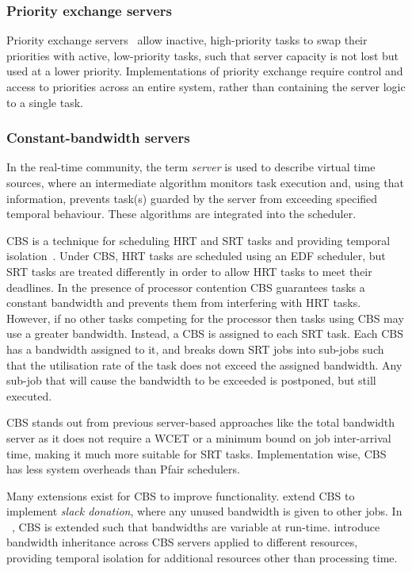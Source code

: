 \subsubsection{Priority exchange servers}

Priority exchange servers~\citep{Sprunt_SL_89a, Spuri_Buttazzo_94} allow inactive, high-priority tasks to swap their
priorities with active, low-priority tasks, such that server capacity is not lost but used at a lower
priority. Implementations of priority exchange require control and access to priorities across an
entire system, rather than containing the server logic to a single task.

\subsubsection{Constant-bandwidth servers}

In the real-time community, the term \emph{server} is used to describe virtual time sources, where
an intermediate algorithm monitors task execution and, using that information, prevents task(s)
guarded by the server from exceeding specified temporal behaviour. These algorithms are integrated
into the scheduler.

\Gls{CBS} is a technique for scheduling \gls{HRT} and
\gls{SRT} tasks and providing temporal isolation~\citep{Abeni_Buttazzo_04}. Under \gls{CBS}, \gls{HRT} tasks are scheduled using an \gls{EDF}
scheduler, but \gls{SRT} tasks are treated differently in order to allow \gls{HRT} tasks to meet
their deadlines. In the presence of processor contention \gls{CBS} guarantees tasks a constant
bandwidth and prevents them from interfering with \gls{HRT} tasks. However, if no other tasks
competing for the processor then tasks using CBS may use a greater bandwidth.
Instead, a \gls{CBS} is assigned to each \gls{SRT} task.  Each \gls{CBS} has a bandwidth assigned to
it, and breaks down \gls{SRT} jobs into sub-jobs such that the utilisation rate of the task does not
exceed the assigned bandwidth.  Any sub-job that will cause the bandwidth to be exceeded is
postponed, but still executed.

\gls{CBS} stands out from previous server-based approaches like the total bandwidth
server\citep{Spuri_Buttazzo_94} as it does not require a \gls{WCET} or a minimum
bound on job inter-arrival time, making it much more suitable for \gls{SRT} tasks.  Implementation
wise, \gls{CBS} has less system overheads than Pfair schedulers.

Many extensions exist for \gls{CBS} to improve functionality.  \citet{Kato_IR_11} extend \gls{CBS} to
implement \emph{slack donation}, where any unused bandwidth is given to other jobs.  In
~\citep{Craciunas_KPRS_12}, \gls{CBS} is extended such that bandwidths are variable at run-time.
\citet{Lamastra_LA_01} introduce bandwidth inheritance across CBS servers applied to different
resources, providing temporal isolation for additional resources other than processing time.

